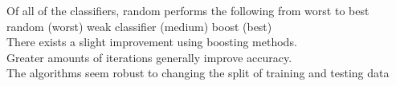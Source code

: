 Of all of the classifiers, random performs the following from worst to best\\
random (worst) weak classifier (medium) boost (best)\\
There exists a slight improvement using boosting methods.\\
Greater amounts of iterations generally improve accuracy.\\
The algorithms seem robust to changing the split of training and testing data\\
